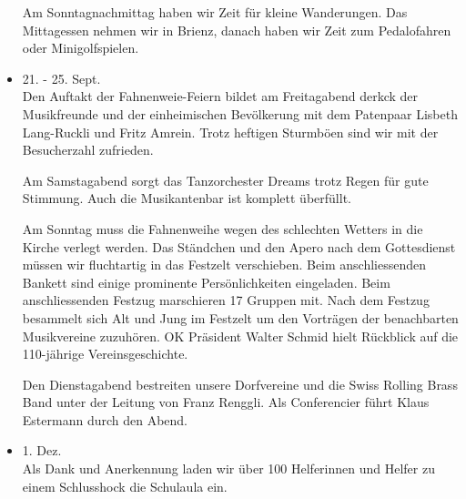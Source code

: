 \begin{multicols}{2}
\begin{itemize}
        Am Sonntagnachmittag haben wir Zeit für kleine Wanderungen. Das
        Mittagessen nehmen wir in Brienz, danach haben wir Zeit zum Pedalofahren
        oder Minigolfspielen.

        \item[]21. - 25. Sept.\\
        Den Auftakt der Fahnenweie-Feiern bildet am Freitagabend derkck der
        Musikfreunde und der einheimischen Bevölkerung mit dem Patenpaar Lisbeth
        Lang-Ruckli und Fritz Amrein. Trotz heftigen Sturmböen sind wir mit der
        Besucherzahl zufrieden.

        Am Samstagabend sorgt das Tanzorchester Dreams trotz Regen für gute
        Stimmung. Auch die Musikantenbar ist komplett überfüllt.

        Am Sonntag muss die Fahnenweihe wegen des schlechten Wetters in die
        Kirche verlegt werden. Das Ständchen und den Apero nach dem Gottesdienst
        müssen wir fluchtartig in das Festzelt verschieben. Beim anschliessenden
        Bankett sind einige prominente Persönlichkeiten eingeladen. Beim
        anschliessenden Festzug marschieren 17 Gruppen mit. Nach dem Festzug
        besammelt sich Alt und Jung im Festzelt um den Vorträgen der
        benachbarten Musikvereine zuzuhören. OK Präsident Walter Schmid hielt
        Rückblick auf die 110-jährige Vereinsgeschichte.

        Den Dienstagabend bestreiten unsere Dorfvereine und die Swiss Rolling
        Brass Band unter der Leitung von Franz Renggli. Als Conferencier führt
        Klaus Estermann durch den Abend.

        \item[]1. Dez.\\
        Als Dank und Anerkennung laden wir über 100 Helferinnen und Helfer zu
        einem Schlusshock die Schulaula ein.

    \end{itemize}

\end{multicols}
